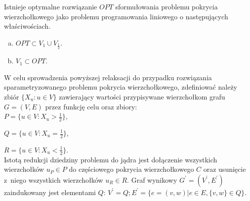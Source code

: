 \begin{theorem}
  Istnieje optymalne rozwiązanie $OPT$ sformułowania problemu pokrycia wierzchołkowego jako problemu programowania liniowego o następujących właściwościach.
  \begin{enumerate}[(a)]
    \item $OPT \subset V_1 \cup V_{\frac{1}{2}}$.
    \item $V_1 \subset OPT$.
  \end{enumerate}
\end{theorem}
W celu sprowadzenia powyższej relaksacji do przypadku rozwiązania
sparametryzowanego problemu pokrycia wierzchołkowego, zdefiniować należy zbiór 
$\{ X_u : u \in V \}$ zawierający wartości przypisywane wierzchołkom grafu 
$G=(V,E)$ przez funkcję celu oraz zbiory:\\


$P=\{u \in V : X_u>\frac{1}{2}\}$,\par
$Q=\{u \in V : X_u=\frac{1}{2}\}$,\par
$R=\{u \in V : X_u<\frac{1}{2}\}$.\\


Istotą redukcji dziedziny problemu do jądra jest dołączenie wszystkich
wierzchołków $u_P \in P$ do częściowego pokrycia wierzchołkowego $C$ oraz 
usunięcie z~niego wszystkich wierzchołków $u_R \in R$.
Graf wynikowy $G^\prime=(V^\prime, E^\prime)$ zaindukowany jest elementami $Q$: 
$V^\prime=Q; E^\prime=\{e=(v, w)| e \in E, \{v, w\} \in Q\}$.

